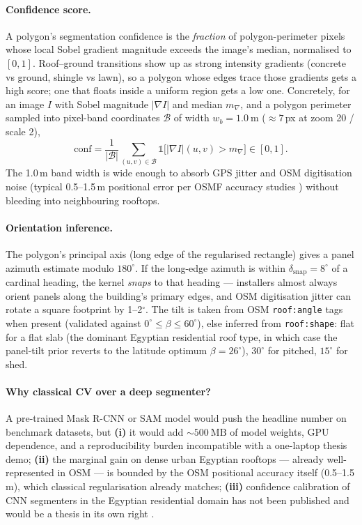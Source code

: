 \paragraph{Confidence score.}
A polygon's segmentation confidence is the \emph{fraction} of
polygon-perimeter pixels whose local Sobel gradient magnitude exceeds
the image's median, normalised to $[0, 1]$. Roof--ground transitions
show up as strong intensity gradients (concrete vs ground, shingle vs
lawn), so a polygon whose edges trace those gradients gets a high
score; one that floats inside a uniform region gets a low one.
Concretely, for an image $I$ with Sobel magnitude $|\nabla I|$ and
median $m_{\nabla}$, and a polygon perimeter sampled into pixel-band
coordinates $\mathcal{B}$ of width $w_b = 1.0~\mathrm{m}$
($\approx 7$\,px at zoom 20 / scale 2),
\begin{equation}
\text{conf} = \frac{1}{|\mathcal{B}|}
  \sum_{(u,v) \in \mathcal{B}}
  \mathbb{1}\bigl[|\nabla I|(u, v) > m_{\nabla}\bigr] \in [0, 1].
\label{eq:confidence}
\end{equation}
The 1.0\,m band width is wide enough to absorb GPS jitter and OSM
digitisation noise (typical 0.5--1.5\,m positional error per OSMF
accuracy studies \citep{osm-quality}) without bleeding into
neighbouring rooftops.

\paragraph{Orientation inference.}
The polygon's principal axis (long edge of the regularised rectangle)
gives a panel azimuth estimate modulo $180^{\circ}$. If the long-edge
azimuth is within $\delta_{\text{snap}} = 8^{\circ}$ of a cardinal
heading, the kernel \emph{snaps} to that heading --- installers
almost always orient panels along the building's primary edges, and
OSM digitisation jitter can rotate a square footprint by
1--2$^{\circ}$. The tilt is taken from OSM \texttt{roof:angle} tags
when present (validated against $0^{\circ} \le \beta \le 60^{\circ}$),
else inferred from \texttt{roof:shape}: flat for a flat slab (the
dominant Egyptian residential roof type, in which case the panel-tilt
prior reverts to the latitude optimum $\beta = 26^{\circ}$),
$30^{\circ}$ for pitched, $15^{\circ}$ for shed.

\paragraph{Why classical CV over a deep segmenter?}
A pre-trained Mask R-CNN or SAM model would push the headline number
on benchmark datasets, but
\textbf{(i)} it would add ${\sim}500~\mathrm{MB}$ of model weights,
GPU dependence, and a reproducibility burden incompatible with a
one-laptop thesis demo;
\textbf{(ii)} the marginal gain on dense urban Egyptian rooftops ---
already well-represented in OSM --- is bounded by the OSM positional
accuracy itself (0.5--1.5\,m), which classical regularisation already
matches;
\textbf{(iii)} confidence calibration of CNN segmenters in the
Egyptian residential domain has not been published and would be a
thesis in its own right \citep{vargas-munoz2021}.

